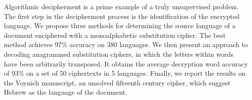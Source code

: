 Algorithmic decipherment is a prime example of a truly unsupervised problem. The first step in the decipherment process is the identification of the encrypted language. We propose three methods for determining the source language of a document enciphered with a monoalphabetic substitution cipher. The best method achieves 97\% accuracy on 380 languages. We then present an approach to decoding anagrammed substitution ciphers, in which the letters within words have been arbitrarily transposed. It obtains the average decryption word accuracy of 93\% on a set of 50 ciphertexts in 5 languages. Finally, we report the results on the Voynich manuscript, an unsolved fifteenth century cipher, which suggest Hebrew as the language of the document.